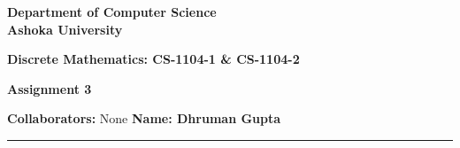 \documentclass[a4paper]{article}
\begin{document}
\begin{center}
{\large \bf \color{red}  Department of Computer Science} \\
{\large \bf \color{red}  Ashoka University} \\

\vspace{0.1in}

{\large \bf \color{blue}  Discrete Mathematics: CS-1104-1 \& CS-1104-2}

\vspace{0.05in}

    { \bf \color{YellowOrange} Assignment 3}
\end{center}
\medskip

{\textbf{Collaborators:} None} \hfill {\textbf{Name: Dhruman Gupta} }

\bigskip
\hrule


\end{document}
